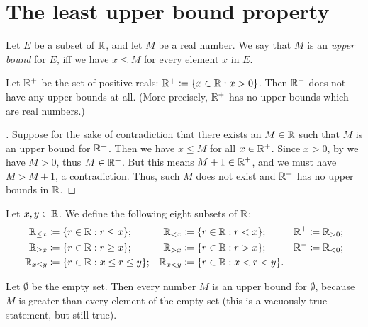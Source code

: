 \section{The least upper bound property}\label{i:sec:5.5}

\begin{defn}\label{i:5.5.1}
  Let \(E\) be a subset of \(\mathbb{R}\), and let \(M\) be a real number.
  We say that \(M\) is an \emph{upper bound} for \(E\), iff we have \(x \leq M\) for every element \(x\) in \(E\).
\end{defn}

\setcounter{thm}{2}
\begin{eg}\label{i:5.5.3}
  Let \(\mathbb{R}^+\) be the set of positive reals: \(\mathbb{R}^+ \coloneqq \left\lbrace x \in \mathbb{R} : x > 0\right\rbrace\).
  Then \(\mathbb{R}^+\) does not have any upper bounds at all.
  (More precisely, \(\mathbb{R}^+\) has no upper bounds which are real numbers.)
\end{eg}

\begin{proof}[]
  Suppose for the sake of contradiction that there exists an \(M \in \mathbb{R}\) such that \(M\) is an upper bound for \(\mathbb{R}^+\).
  Then we have \(x \leq M\) for all \(x \in \mathbb{R}^+\).
  Since \(x > 0\), by  we have \(M > 0\), thus \(M \in \mathbb{R}^+\).
  But this means \(M + 1 \in \mathbb{R}^+\), and we must have \(M > M + 1\), a contradiction.
  Thus, such \(M\) does not exist and \(\mathbb{R}^+\) has no upper bounds in \(\mathbb{R}\).
\end{proof}

\begin{ac}\label{i:ac:5.5.1}
  Let \(x, y \in \mathbb{R}\).
  We define the following eight subsets of \(\mathbb{R}\):
  \begin{align*}
    \R_{\leq x}   & \coloneqq \set{r \in \R : r \leq x};        & \R_{< x}   & \coloneqq \set{r \in \R : r < x};     & \R^+ & \coloneqq \R_{> 0}; \\
    \R_{\geq x}   & \coloneqq \set{r \in \R : r \geq x};        & \R_{> x}   & \coloneqq \set{r \in \R : r > x};     & \R^- & \coloneqq \R_{< 0}; \\
    \R_{x \leq y} & \coloneqq \set{r \in \R : x \leq r \leq y}; & \R_{x < y} & \coloneqq \set{r \in \R : x < r < y}. &      &
  \end{align*}
\end{ac}

\begin{eg}\label{i:5.5.4}
  Let \(\emptyset\) be the empty set.
  Then every number \(M\) is an upper bound for \(\emptyset\), because \(M\) is greater than every element of the empty set
  (this is a vacuously true statement, but still true).
\end{eg}

